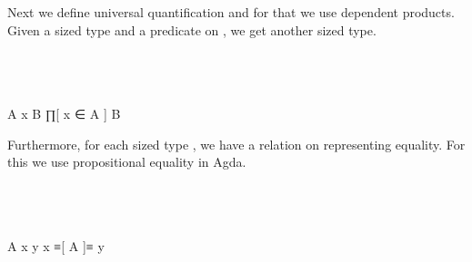 Next we define universal quantification and for that we use dependent products.
Given a sized type  and a predicate on , we get another sized type.

\begin{code}%
\>[0]\AgdaSpace{}%
\AgdaSymbol{:}\AgdaSpace{}%
\AgdaSymbol{(}\AgdaSpace{}%
\AgdaSymbol{:}\AgdaSpace{}%
\AgdaSymbol{)}\AgdaSpace{}%
\AgdaSpace{}%
\AgdaSpace{}%
\AgdaSpace{}%
\AgdaSpace{}%
\<%
\\
\>[0]\AgdaSpace{}%
\AgdaSpace{}%
\AgdaSpace{}%
\AgdaSpace{}%
\AgdaSymbol{=}\AgdaSpace{}%
\AgdaSymbol{(}\AgdaSpace{}%
\AgdaSymbol{:}\AgdaSpace{}%
\AgdaSpace{}%
\AgdaSymbol{)}\AgdaSpace{}%
\AgdaSpace{}%
\AgdaSpace{}%
\<%
\\
%
\\[\AgdaEmptyExtraSkip]%
\>[0]\AgdaSpace{}%
 A  x  B\AgdaSymbol{)}\AgdaSpace{}%
\AgdaSymbol{=} ∏[ x ∈ A ] B\<%
\end{code}

Furthermore, for each sized type , we have a relation on  representing equality.
For this we use propositional equality in Agda.

\begin{code}%
\>[0]\AgdaSpace{}%
\AgdaSymbol{:}\AgdaSpace{}%
\AgdaSymbol{(}\AgdaSpace{}%
\AgdaSymbol{:}\AgdaSpace{}%
\AgdaSymbol{)}\AgdaSpace{}%
\AgdaSpace{}%
\AgdaSpace{}%
\AgdaSpace{}%
\<%
\\
\>[0]\AgdaSpace{}%
\AgdaSpace{}%
\AgdaSpace{}%
\AgdaSpace{}%
\AgdaSymbol{=}\AgdaSpace{}%
\AgdaSpace{}%
\AgdaSpace{}%
\<%
\\
%
\\[\AgdaEmptyExtraSkip]%
\>[0]\AgdaSpace{}%
 A x y \AgdaSymbol{=} x ≡[ A ]≡ y\<%
\end{code}

\begin{code}%
\>[0]\AgdaSpace{}%
\AgdaSymbol{:}\AgdaSpace{}%
\<%
\\
\>[0]\AgdaSpace{}%
\AgdaSpace{}%
\AgdaSymbol{=}\AgdaSpace{}%
\AgdaSpace{}%
\<%
\end{code}


